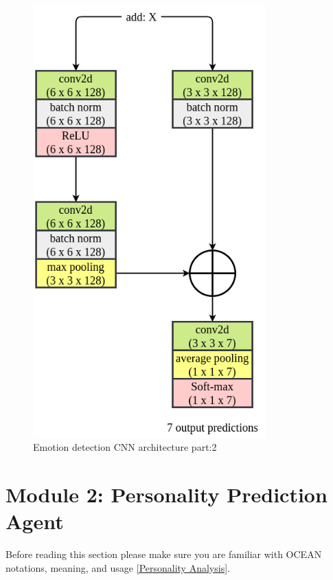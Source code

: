 \begin{figure}[h!]
\centering
\includegraphics[width=0.8\textwidth]{images/emotion_arch_2.png}
\caption{Emotion detection CNN architecture part:2}
\label{fig:emotion_arch_2}
\end{figure}







\newpage
\section{Module 2: Personality Prediction Agent}
\label{sec:module_2}
Before reading this section please make sure you are familiar with OCEAN notations, meaning, and usage \ref{Personality Analysis}.

